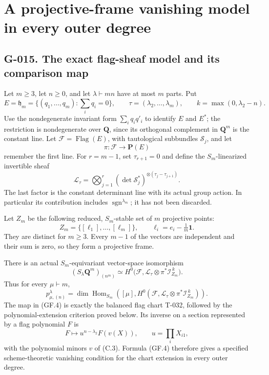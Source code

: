 \documentclass[
  10pt,
]{article}
\begin{document}
\section{A projective-frame vanishing model in every outer
degree}\label{a-projective-frame-vanishing-model-in-every-outer-degree}

\subsection{G-015. The exact flag-sheaf model and its comparison
map}\label{g-015.-the-exact-flag-sheaf-model-and-its-comparison-map}

Let \(m\ge3\), let \(n\ge0\), and let \(\lambda\vdash mn\) have at most
\(m\) parts. Put \[
E=\mathfrak h_m=\{(q_1,\ldots,q_m):\sum_iq_i=0\},\qquad
\tau=(\lambda_2,\ldots,\lambda_m),\qquad
k=\max(0,\lambda_2-n).
\tag{GF.1}
\] Use the nondegenerate invariant form \(\sum_iq_iq'_i\) to identify
\(E\) and \(E^*\); the restriction is nondegenerate over \(\mathbf Q\),
since its orthogonal complement in \(\mathbf Q^m\) is the constant line.
Let \(\mathcal F=\operatorname{Flag}(E)\), with tautological subbundles
\(\mathcal S_j\), and let \[
\pi:\mathcal F\longrightarrow\mathbf P(E)
\] remember the first line. For \(r=m-1\), set \(\tau_{r+1}=0\) and
define the \(S_m\)-linearized invertible sheaf \[
\mathcal L_\tau=
\bigotimes_{j=1}^{r}
(\det\mathcal S_j^*)^{\otimes(\tau_j-\tau_{j+1})}.
\tag{GF.2}
\] The last factor is the constant determinant line with its actual
group action. In particular its contribution includes
\(\operatorname{sgn}^{\lambda_m}\); it has not been discarded.

Let \(Z_m\) be the following reduced, \(S_m\)-stable set of \(m\)
projective points: \[
Z_m=\{[\ell_1],\ldots,[\ell_m]\},\qquad
\ell_i=e_i-\tfrac1m\mathbf1.
\tag{GF.3}
\] They are distinct for \(m\ge3\). Every \(m-1\) of the vectors are
independent and their sum is zero, so they form a projective frame.

There is an actual \(S_m\)-equivariant vector-space isomorphism \[
\boxed{
(S_\lambda\mathbf Q^m)_{(n^m)}
\simeq
H^0\bigl(\mathcal F,
\mathcal L_\tau\otimes\pi^*\mathcal I_{Z_m}^{\,k}\bigr).}
\tag{GF.4}
\] Thus for every \(\mu\vdash m\), \[
\boxed{
p_{\mu,(n)}^\lambda=
\dim\operatorname{Hom}_{S_m}\!\left(
[\mu],H^0(\mathcal F,
\mathcal L_\tau\otimes\pi^*\mathcal I_{Z_m}^{\,k})\right).}
\tag{GF.5}
\] The map in (GF.4) is exactly the balanced flag chart T-032, followed
by the polynomial-extension criterion proved below. Its inverse on a
section represented by a flag polynomial \(F\) is \[
F\longmapsto u^{n-\lambda_2}F(v(X)),
\qquad u=\prod_iX_{i1},
\tag{GF.6}
\] with the polynomial minors \(v\) of (C.3). Formula (GF.4) therefore
gives a specified scheme-theoretic vanishing condition for the chart
extension in every outer degree.
\end{document}
